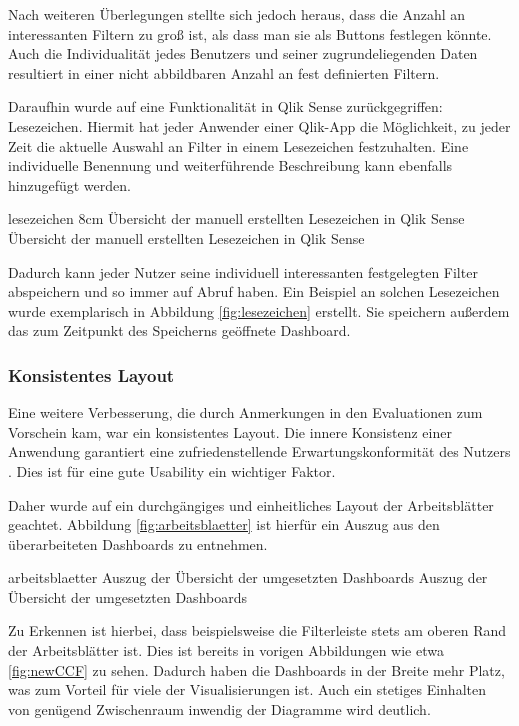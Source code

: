 Nach weiteren Überlegungen stellte sich jedoch heraus, dass die Anzahl an interessanten Filtern zu groß ist, als dass man sie als Buttons festlegen könnte.
Auch die Individualität jedes Benutzers und seiner zugrundeliegenden Daten resultiert in einer nicht abbildbaren Anzahl an fest definierten Filtern.

Daraufhin wurde auf eine Funktionalität in Qlik Sense zurückgegriffen: Lesezeichen.
Hiermit hat jeder Anwender einer Qlik-App die Möglichkeit, zu jeder Zeit die aktuelle Auswahl an Filter in einem Lesezeichen festzuhalten.
Eine individuelle Benennung und weiterführende Beschreibung kann ebenfalls hinzugefügt werden.

\bild
{lesezeichen}
{8cm}
{Übersicht der manuell erstellten Lesezeichen in Qlik Sense}
{Übersicht der manuell erstellten Lesezeichen in Qlik Sense}

Dadurch kann jeder Nutzer seine individuell interessanten festgelegten Filter abspeichern und so immer auf Abruf haben.
Ein Beispiel an solchen Lesezeichen wurde exemplarisch in Abbildung \ref{fig:lesezeichen} erstellt.
Sie speichern außerdem das zum Zeitpunkt des Speicherns geöffnete Dashboard.

\subsubsection{Konsistentes Layout}
Eine weitere Verbesserung, die durch Anmerkungen in den Evaluationen zum Vorschein kam, war ein konsistentes Layout.
Die innere Konsistenz einer Anwendung garantiert eine zufriedenstellende Erwartungskonformität des Nutzers \cite[S.65]{Abele.2007}.
Dies ist für eine gute Usability ein wichtiger Faktor.

Daher wurde auf ein durchgängiges und einheitliches Layout der Arbeitsblätter geachtet.
Abbildung \ref{fig:arbeitsblaetter} ist hierfür ein Auszug aus den überarbeiteten Dashboards zu entnehmen.

\bildbreit
{arbeitsblaetter}
{Auszug der Übersicht der umgesetzten Dashboards}
{Auszug der Übersicht der umgesetzten Dashboards}

Zu Erkennen ist hierbei, dass beispielsweise die Filterleiste stets am oberen Rand der Arbeitsblätter ist.
Dies ist bereits in vorigen Abbildungen wie etwa \ref{fig:newCCF} zu sehen.
Dadurch haben die Dashboards in der Breite mehr Platz, was zum Vorteil für viele der Visualisierungen ist.
Auch ein stetiges Einhalten von genügend Zwischenraum  inwendig der Diagramme wird deutlich.

